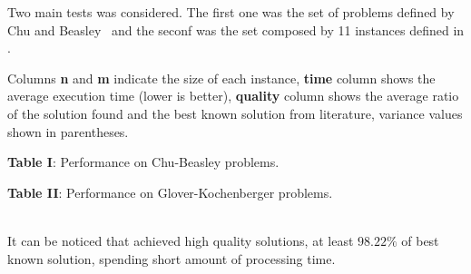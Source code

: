 Two main tests was considered.
The first one was the set of problems defined by Chu and Beasley~\cite{Chu-Beasley-1998}
and the seconf was the set composed by 11 instances defined in \cite{glover1996critical}.

Columns {\bf n} and {\bf m} indicate the size of each instance,
{\bf time} column shows the average execution time (lower is better),
{\bf quality} column shows the average ratio of the solution found and
the best known solution from literature, variance values shown in parentheses.
\\[3pt]
\begin{minipage}[c]{0.4\linewidth}
  \begin{center}
      {\bf Table I}: Performance on Chu-Beasley problems. \\[3pt]
    
  \end{center}
  \vfill
\end{minipage}
\begin{minipage}[c]{0.6\linewidth}
  \begin{center}
      {\bf Table II}: Performance on Glover-Kochenberger problems.  \\[3pt]
    
  \end{center}
\end{minipage}
\\

It can be noticed that \scecore achieved high quality solutions, at least $98.22\%$
of best known solution, spending short amount of processing time.
